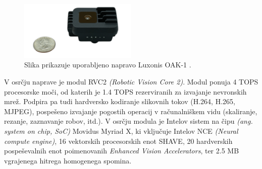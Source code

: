 \documentclass[a4paper,12pt,openright]{book}
\begin{document}
\begin{figure}[ht]
    \begin{center}
        \includegraphics[width=0.5\textwidth]{img/oak-1.png}
    \end{center}
    \caption{Slika prikazuje uporabljeno napravo Luxonis OAK-1 \cite{luxonis}.}
    \label{img:oak}
\end{figure}

V osrčju naprave je modul RVC2 \emph{(Robotic Vision Core 2)}. Modul ponuja 4 TOPS procesorske moči, od katerih je 1.4 TOPS rezerviranih za izvajanje nevronskih mrež. Podpira pa tudi hardversko kodiranje slikovnih tokov (H.264, H.265, MJPEG), pospešeno izvajanje pogostih operacij v računalniškem vidu (skaliranje, rezanje, zaznavanje robov, itd.). V osrčju modula je Intelov sistem na čipu \emph{(ang. system on chip, SoC)} Movidus Myriad X, ki vključuje Intelov NCE \emph{(Neural compute engine)}, 16 vektorskih procesorskih enot SHAVE, 20 hardverskih pospeševalnih enot poimenovanih \emph{Enhanced Vision Accelerators}, ter 2.5 MB vgrajenega hitrega homogenega spomina.
\end{document}
